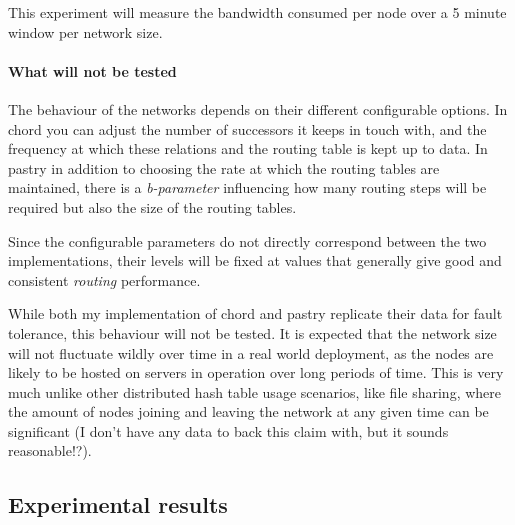 This experiment will measure the bandwidth consumed per node over a 5 minute window per network size.

\paragraph{What will not be tested}
The behaviour of the networks depends on their different configurable options. 
In chord you can adjust the number of successors it keeps in touch with, and the frequency at which these relations and the routing table is kept up to data.
In pastry in addition to choosing the rate at which the routing tables are maintained, there is a \textit{b-parameter} influencing how many routing steps will be required but also the size of the routing tables.

Since the configurable parameters do not directly correspond between the two implementations, their levels will be fixed at values that generally give good and consistent \textit{routing} performance.

While both my implementation of chord and pastry replicate their data for fault tolerance, this behaviour will not be tested. It is expected that the network size will not fluctuate wildly over time in a real world deployment, as the nodes are likely to be hosted on servers in operation over long periods of time. This is very much unlike other distributed hash table usage scenarios, like file sharing, where the amount of nodes joining and leaving the network at any given time can be significant (I don't have any data to back this claim with, but it sounds reasonable!?).


\subsection{Experimental results}
